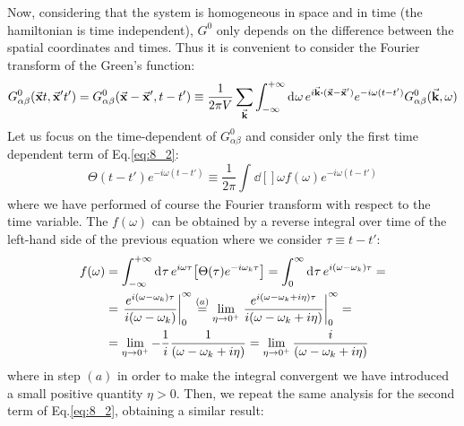 \documentclass[../main/main.tex]{subfiles}
\begin{document}


Now, considering that the system is homogeneous in space and in time (the hamiltonian is time independent), \( G^0 \) only depends on the difference between the spatial coordinates and times. Thus it is convenient to consider the Fourier transform of the Green's function:
\begin{equation*}
  G_{\alpha \beta }^0 (\va{x}t,\va{x}'t') = G_{\alpha \beta }^0 (\va{x}-\va{x}',t-t') \equiv
  \frac{1}{2 \pi V} \sum_{\va{k}}^{}
  \int_{- \infty }^{+ \infty } \dd[]{\omega } e^{i \va{k}\vdot (\va{x}-\va{x}')} e^{-i \omega (t-t')} G_{\alpha \beta }^0 (\va{k}, \omega )
\end{equation*}
Let us focus on the time-dependent of \( G^0_{\alpha \beta } \) and consider only  the first time dependent term of Eq.\eqref{eq:8_2}:
\begin{equation*}
  \Theta(t-t') e^{-i \omega (t-t') } \equiv \frac{1}{2 \pi } \int_{}^{} \dd[]{\omega } f(\omega )e^{-i \omega (t-t')}
\end{equation*}
where we have performed of course the Fourier transform with respect to the time variable.
The \( f(\omega ) \) can be obtained by a reverse integral over time of the left-hand side of the previous equation where we consider \( \tau \equiv t-t' \):
\begin{equation*}
\begin{split}
  f(\omega )&=  \int_{- \infty }^{+ \infty } \dd[]{\tau } e^{i \omega \tau } \qty[ \Theta (\tau ) e^{-i \omega _k \tau } ]
  = \int_{0}^{\infty } \dd[]{\tau }  e^{i(\omega -\omega _k)\tau }   =  \\
  &= \eval{\frac{e^{i(\omega - \omega _k) \tau } }{i( \omega - \omega _k)}}_0^\infty
  \overset{(a)}{=} \lim_{\eta  \rightarrow  0^+}
  \eval{\frac{e^{i(\omega - \omega _k + i \eta ) \tau } }{i( \omega - \omega _k + i \eta )}}_0^\infty = \\
  &= \lim_{\eta  \rightarrow  0^+} - \frac{1}{i} \frac{1}{(\omega - \omega _k + i \eta )} = \lim_{\eta  \rightarrow  0^+}  \frac{i}{(\omega - \omega _k + i \eta )}
\end{split}
\end{equation*}
where in step \( (a) \) in order  to make the integral convergent we have introduced a small positive quantity \( \eta >0 \).
Then, we repeat the same analysis for the second term of Eq.\eqref{eq:8_2}, obtaining a similar result:
\end{document}
